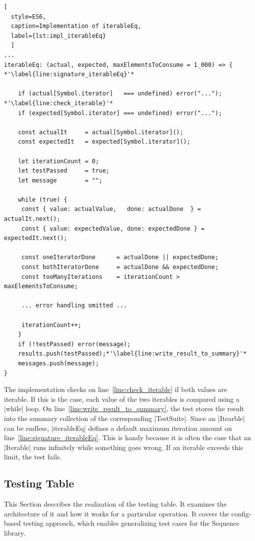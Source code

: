 \begin{lstlisting}[
  style=ES6, 
  caption=Implementation of iterableEq,
  label={lst:impl_iterableEq}
  ]
...
iterableEq: (actual, expected, maxElementsToConsume = 1_000) => { *'\label{line:signature_iterableEq}'*

    if (actual[Symbol.iterator]   === undefined) error("..."); *'\label{line:check_iterable}'*
    if (expected[Symbol.iterator] === undefined) error("...");

    const actualIt     = actual[Symbol.iterator]();
    const expectedIt   = expected[Symbol.iterator]();

    let iterationCount = 0;
    let testPassed     = true;
    let message        = "";

    while (true) {
     const { value: actualValue,   done: actualDone  } = actualIt.next();
     const { value: expectedValue, done: expectedDone } = expectedIt.next();

     const oneIteratorDone      = actualDone || expectedDone;
     const bothIteratorDone     = actualDone && expectedDone;
     const tooManyIterations    = iterationCount > maxElementsToConsume;

     ... error handling omitted ...

     iterationCount++;
    }
    if (!testPassed) error(message);
    results.push(testPassed);*'\label{line:write_result_to_summary}'*
    messages.push(message);
}
\end{lstlisting}

The implementation checks on line~\ref{line:check_iterable} if both values are
iterable. If this is the case, each value of the two iterables is compared
using a |while| loop. On line~\ref{line:write_result_to_summary}, the
test stores the result into the summary collection of the corresponding |TestSuite|.
\newline
Since an |Itearble| can be endless, |iterableEq| defines a default maximum
iteration amount on line~\ref{line:signature_iterableEq}.  This is handy
because it is often the case that an |Iterable| runs infinitely while something
goes wrong. If an iterable exceeds this limit, the test fails.


\subsection{Testing Table}
\label{sub:Testing Table}
This Section describes the realization of the testing table. It examines the
architecture of it and how it works for a particular operation. It covers the
config-based testing approach, which enables generalizing test cases for the
Sequence library.

